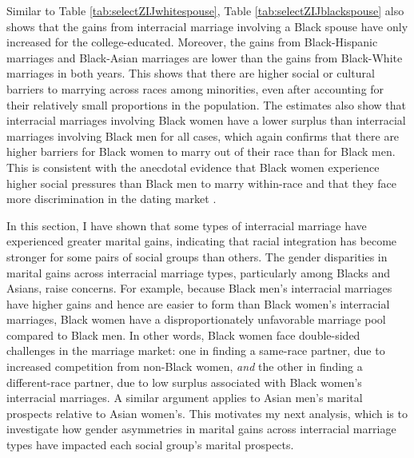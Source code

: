 


 Similar to Table \ref{tab:selectZIJwhitespouse}, Table \ref{tab:selectZIJblackspouse}  also shows that the gains from interracial marriage involving a Black spouse have only increased for the college-educated. Moreover, the gains from Black-Hispanic marriages and Black-Asian marriages are lower than the gains from Black-White marriages in both years. This shows that there are higher social or cultural barriers to marrying across races among minorities, even after accounting for their relatively small proportions in the population.  The estimates also show that interracial marriages involving Black women have a lower surplus than interracial marriages involving Black men for all cases, which again confirms that there are higher barriers for Black women to marry out of their race than for Black men. This is consistent with the anecdotal evidence that Black women experience higher social pressures than Black men to marry within-race \citep{Banks_book_2012} and that they face more discrimination in the dating market \citep{Stewart_book_2020}. 


\vspace{3mm}

In this section, I have shown that some types of interracial marriage have experienced greater marital gains, indicating that racial integration has become stronger for some pairs of social groups than others. The gender disparities in marital gains across interracial marriage types, particularly among Blacks and Asians, raise concerns. For example, because Black men's interracial marriages have higher gains and hence are easier to form than Black women's interracial marriages, Black women have a disproportionately unfavorable marriage pool compared to Black men. In other words, Black women face double-sided challenges in the marriage market: one in finding a same-race partner, due to increased competition from non-Black women, \textit{and} the other in finding a different-race partner, due to low surplus associated with Black women's interracial marriages. A similar argument applies to Asian men's marital prospects relative to Asian women's. This motivates my next analysis, which is to investigate how gender asymmetries in marital gains across interracial marriage types have impacted each social group's marital prospects. 

